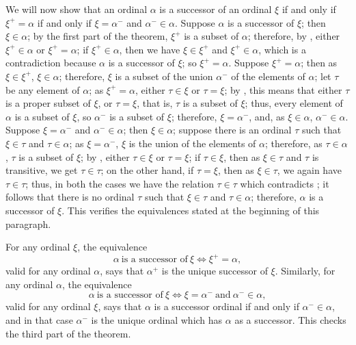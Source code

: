 \documentclass{article}
\begin{document}
We will now show that an ordinal \(\alpha\) is a successor of an
ordinal \(\xi\) if and only if \(\xi^+ = \alpha\) if and only if
\(\xi = \alpha^-\) and \(\alpha^- \in \alpha\).  Suppose \(\alpha\) is
a successor of \(\xi\); then \(\xi \in \alpha\); by the first part of
the theorem, \(\xi^+\) is a subset of \(\alpha\); therefore, by
, either \(\xi^+ \in \alpha\) or
\(\xi^+ = \alpha\); if \(\xi^+ \in \alpha\), then we have
\(\xi \in \xi^+\) and \(\xi^+ \in \alpha\), which is a contradiction
because \(\alpha\) is a successor of \(\xi\); so \(\xi^+ = \alpha\).
Suppose \(\xi^+ = \alpha\); then as \(\xi \in \xi^+\),
\(\xi \in \alpha\); therefore, \(\xi\) is a subset of the union
\(\alpha^-\) of the elements of \(\alpha\); let \(\tau\) be any
element of \(\alpha\); as \(\xi^+ = \alpha\), either \(\tau \in \xi\)
or \(\tau = \xi\); by , this means that either
\(\tau\) is a proper subset of \(\xi\), or \(\tau = \xi\), that is,
\(\tau\) is a subset of \(\xi\); thus, every element of \(\alpha\) is
a subset of \(\xi\), so \(\alpha^-\) is a subset of \(\xi\);
therefore, \(\xi = \alpha^-\), and, as \(\xi \in \alpha\),
\(\alpha^- \in \alpha\).  Suppose \(\xi = \alpha^-\) and
\(\alpha^- \in \alpha\); then \(\xi \in \alpha\); suppose there is an
ordinal \(\tau\) such that \(\xi \in \tau\) and \(\tau \in \alpha\);
as \(\xi = \alpha^-\), \(\xi\) is the union of the elements of
\(\alpha\); therefore, as \(\tau \in \alpha\), \(\tau\) is a subset of
\(\xi\); by , either \(\tau \in \xi\) or
\(\tau = \xi\); if \(\tau \in \xi\), then as \(\xi \in \tau\) and
\(\tau\) is transitive, we get \(\tau \in \tau\); on the other hand,
if \(\tau = \xi\), then as \(\xi \in \tau\), we again have
\(\tau \in \tau\); thus, in both the cases we have the relation
\(\tau \in \tau\) which contradicts ; it follows
that there is no ordinal \(\tau\) such that \(\xi \in \tau\) and
\(\tau \in \alpha\); therefore, \(\alpha\) is a successor of \(\xi\).
This verifies the equivalences stated at the beginning of this
paragraph.

For any ordinal \(\xi\), the equivalence
\begin{displaymath}
  \alpha ~ \text{is a successor of} ~ \xi
  \Leftrightarrow
  \xi^+ = \alpha,
\end{displaymath}
valid for any ordinal \(\alpha\), says that \(\alpha^+\) is the unique
successor of \(\xi\).  Similarly, for any ordinal \(\alpha\), the
equivalence
\begin{displaymath}
  \alpha ~ \text{is a successor of} ~ \xi
  \Leftrightarrow
  \xi = \alpha^- ~ \text{and} ~ \alpha^- \in \alpha,
\end{displaymath}
valid for any ordinal \(\xi\), says that \(\alpha\) is a successor
ordinal if and only if \(\alpha^- \in \alpha\), and in that case
\(\alpha^-\) is the unique ordinal which has \(\alpha\) as a
successor.  This checks the third part of the theorem.
\end{document}
